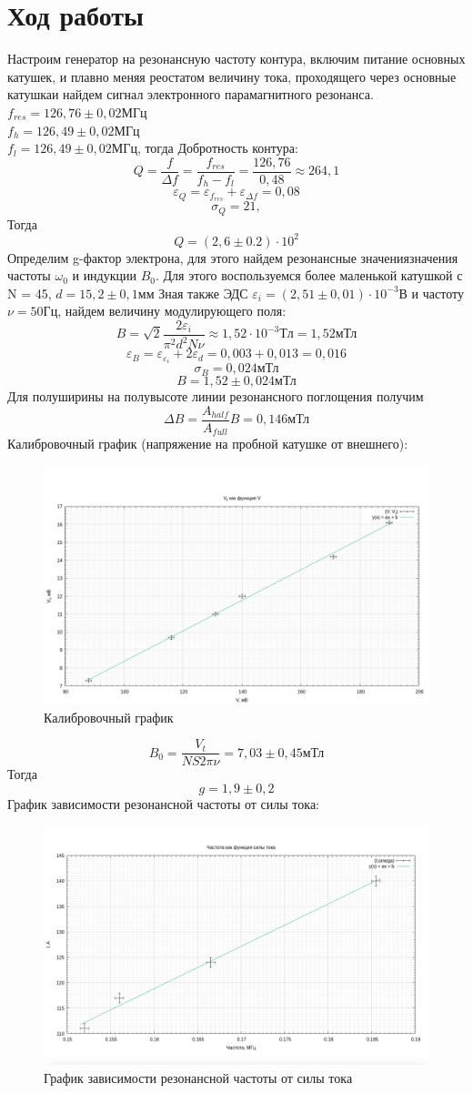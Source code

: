 \documentclass[14pt, a4paper]{extarticle}
\begin{document}
\section{Ход работы} %
\label{sec:ход_работы}
Настроим генератор на резонансную частоту контура, включим питание основных катушек, и плавно меняя реостатом величину тока, проходящего через основные катушкаи найдем сигнал электронного парамагнитного резонанса.
$f_{res} = 126,76\pm 0,02 МГц$\\
$f_h = 126,49 \pm 0,02 МГц$\\
$f_l = 126,49 \pm 0,02 МГц$, тогда Добротность контура:\\
$$
Q = \frac{f}{\Delta f} = \frac{f_{res}}{f_h - f_l} = \frac{126,76}{0,48}\approx264,1
$$ 
$$
\varepsilon_Q = \varepsilon_{f_{res}} + \varepsilon_{\Delta f} = 0,08
$$
$$
\sigma_Q = 21,
$$Тогда
$$
Q = (2,6\pm0.2)\cdot10^2
$$
Определим g-фактор электрона, для этого найдем резонансные значениязначения частоты $\omega_0 $ и индукции $B_0$. Для этого воспользуемся более маленькой катушкой с N = 45, $d = 15,2\pm 0,1$мм
Зная также ЭДС $\varepsilon_i = (2,51\pm0,01)\cdot10^{-3}В$ и частоту $\nu = 50 Гц$, найдем величину модулирующего поля:
$$B=\sqrt{2} \frac{2 \varepsilon_i}{\pi^2d^2N\nu} \approx 1,52 \cdot 10^{-3}Тл = 1,52 \text{мТл}$$
$$\varepsilon_B = \varepsilon_{\varepsilon_i} + 2\varepsilon_d = 0,003 + 0,013
= 0,016$$
$$\sigma_B = 0,024 \text{мТл}$$
$$B = 1,52 \pm 0,024 \text{мТл}$$
Для полуширины на полувысоте линии резонансного поглощения получим
$$\Delta B= \frac{A_{half}}{A_{full}} B = 0,146 \text{мТл}$$
Калибровочный график (напряжение на пробной катушке от внешнего):
\begin{figure}[h!]
	\centering
	\includegraphics[width = 0.7\linewidth]{graph_1}
	\caption{Калибровочный график}
\end{figure}
$$B_0=\frac{V_t}{NS 2 \pi \nu} = 7,03 \pm 0,45 \text{мТл}$$
Тогда
$$g = 1,9 \pm 0,2$$
График зависимости резонансной частоты от силы тока:
\begin{figure}[h!]
	\centering
	\includegraphics[width = 0.7\linewidth]{graph_2}
	\caption{График зависимости резонансной частоты от силы тока}
\end{figure}
\end{document}
